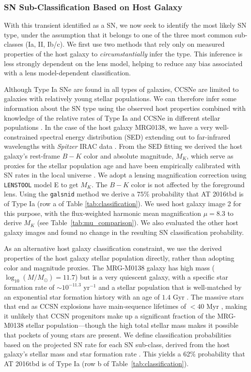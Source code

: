 \documentclass[12pt]{article}
\def\SNABC{AT 2016tbd\xspace}
\def\lenstool{{\tt LENSTOOL}\xspace}
\begin{document}
\subsubsection*{SN Sub-Classification Based on Host Galaxy}
With this transient identified as a SN, we now seek to identify the most likely SN type, under the assumption that it belongs to one of the three most common sub-classes (Ia, II, Ib/c).   We first use two methods that rely only on measured properties of the host galaxy to {\it circumstantially} infer the type. This inference is less strongly dependent on the lens model, helping to reduce any bias associated with a lens model-dependent classification. 

Although Type Ia SNe are found in all types of galaxies, CCSNe are limited to galaxies with relatively young stellar populations.  We can therefore infer some information about the SN type using the observed host properties combined with knowledge of the relative rates of Type Ia and CCSNe in different stellar populations \cite{mannucci_supernova_2005}.  In the case of the host galaxy MRG0138, we have a very well-constrained spectral energy distribution (SED) extending out to far-infrared wavelengths with \textit{Spitzer} IRAC data \cite{newman_resolving_2018,newman_resolving_2018-1}.  
From the SED fitting we derived the host galaxy's 
rest-frame $B-K$ color and absolute magnitude, $M_K$, which serve as proxies for the stellar population age and have been empirically calibrated with SN rates in the local universe \cite{foley_classifying_2013}.  We  adopt a lensing magnification correction using \lenstool model E to get $M_K$. 
The $B-K$ color is not affected by the foreground lens.
Using the {\tt galsnid} method \cite{foley_classifying_2013} we 
derive a $75\%$ probability that \SNABC is of Type Ia (row a of Table \ref{tab:classification}).
We used host galaxy image 2 for this purpose, with the flux-weighted harmonic mean magnification $\mu=8.3$ to derive $M_K$ (see Table~\ref{tab:mu_comparison}).
We also evaluated the other host galaxy images and found no change in the resulting SN classification probability.

As an alternative host galaxy classification constraint, we use the derived properties of the host galaxy stellar population directly,  rather than adopting color and magnitude proxies. The MRG-M0138 galaxy has high mass ($\log_{10}(M/M_{\odot})=11.7$) but is a very quiescent galaxy, with a specific star formation rate of $\sim10^{-11.3}$ yr$^{-1}$  and a stellar population that is well-matched by an exponential star formation history with an age of $1.4$ Gyr \cite{newman_resolving_2018}. 
The massive stars that end as CCSN explosions have main-sequence lifetimes of $<40$ Myr \cite{smartt_progenitors_2009},  making it unlikely that CCSN progenitors make up a significant fraction of the MRG-M0138 stellar population---though the high total stellar mass makes it possible that pockets of young stars are present.  We define classification probabilities based on the projected SN rate for each SN sub-class, derived from the host galaxy's stellar mass and star formation rate \cite{li_rates_2012}.  This yields a 62\% probability that \SNABC is of Type Ia (row b of Table~\ref{tab:classification}).
\end{document}
